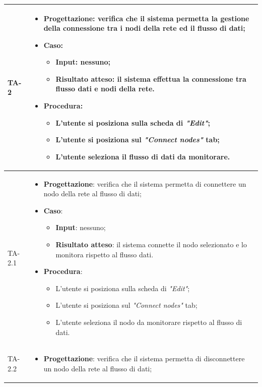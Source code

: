 \begin{longtable}{|C{2.5cm}|C{13cm}|}
{TA-2} &
\begin{itemize}
	\item \textbf{Progettazione}: verifica che il sistema permetta la gestione della connessione tra i nodi della rete ed il flusso di dati;
	\item \textbf{Caso}: 
	\begin{itemize}
		\item \textbf{Input}: nessuno;
		\item \textbf{Risultato atteso}: il sistema effettua la connessione tra flusso dati e nodi della rete.
	\end{itemize}
	\item \textbf{Procedura}:
	\begin{itemize}
		\item L'utente si posiziona sulla scheda di \emph{"Edit"};
		\item L'utente si posiziona sul \emph{"Connect nodes"} tab;
		\item L'utente seleziona il flusso di dati da monitorare.
	\end{itemize} 
\end{itemize} \\
 \hline
{TA-2.1} &
\begin{itemize}
	\item \textbf{Progettazione}: verifica che il sistema permetta di connettere un nodo della rete al flusso di dati;
	\item \textbf{Caso}: 
	\begin{itemize}
		\item \textbf{Input}: nessuno;
		\item \textbf{Risultato atteso}: il sistema connette il nodo selezionato e lo monitora rispetto al flusso dati.
	\end{itemize}
	\item \textbf{Procedura}:
	\begin{itemize}
		\item L'utente si posiziona sulla scheda di \emph{"Edit"};
		\item L'utente si posiziona sul \emph{"Connect nodes"} tab;
		\item L'utente seleziona il nodo da monitorare rispetto al flusso di dati.
	\end{itemize} 
\end{itemize} \\
\hline
{TA-2.2} &
\begin{itemize}
	\item \textbf{Progettazione}: verifica che il sistema permetta di disconnettere un nodo della rete al flusso di dati;

\end{itemize}
\end{longtable}
